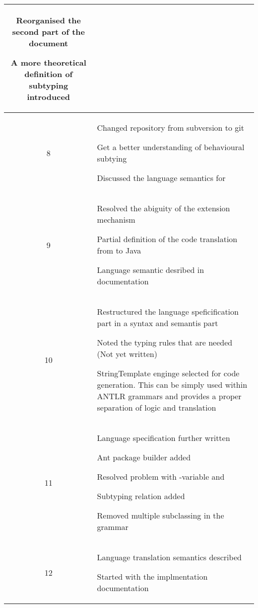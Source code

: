 \begin{center}
\begin{longtable}{|c|p{12cm}|}
\begin{journal}
	\item Reorganised the second part of the document
	\item A more theoretical definition of subtyping introduced
\end{journal}
\\ \hline
8 &
\begin{journal}
	\item Changed repository from subversion to git
	\item Get a better understanding of behavioural subtying
	\item Discussed the language semantics for \mytype
\end{journal}
\\ \hline
9 &
\begin{journal}
	\item Resolved the abiguity of the extension mechanism
	\item Partial definition of the code translation from \ooplss to Java
	\item Language semantic desribed in documentation
\end{journal}
\\ \hline
10 &
\begin{journal}
	\item Restructured the language speficification part in a syntax and semantis part
	\item Noted the typing rules that are needed (Not yet written)
	\item StringTemplate enginge selected for code generation. This can be simply used within ANTLR grammars and provides a proper separation of logic and translation
\end{journal}
\\ \hline
11 &
\begin{journal}
	\item Language specification further written
	\item Ant package builder added
	\item Resolved problem with \self-variable and \mytype
	\item Subtyping relation added
	\item Removed multiple subclassing in the grammar
\end{journal}
\\ \hline
12 &
\begin{journal}
	\item Language translation semantics described
	\item Started with the implmentation documentation

\end{journal}
\end{longtable}
\end{center}
